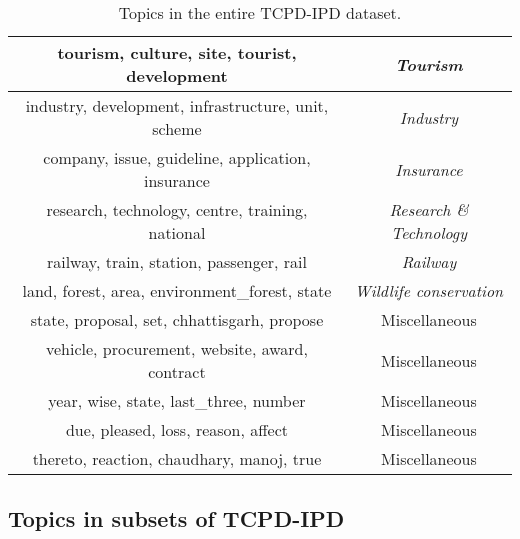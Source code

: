 \documentclass[10pt, a4paper]{article}
\begin{document}
\begin{table}[!htbp]
\begin{adjustbox}{width=0.99\linewidth}
\begin{tabular}{|c|c|}
        tourism, culture, site, tourist, development & \textit{Tourism} \\ \hline
        industry, development, infrastructure, unit, scheme & \textit{Industry} \\ \hline
        company, issue, guideline, application, insurance & \textit{Insurance} \\ \hline
        research, technology, centre, training, national & \textit{Research \& Technology} \\ \hline
        railway, train, station, passenger, rail & \textit{Railway} \\ \hline
        land, forest, area, environment\_forest, state & \textit{Wildlife conservation} \\ \hline
        state, proposal, set, chhattisgarh, propose & Miscellaneous \\ \hline
                vehicle, procurement, website, award, contract & Miscellaneous \\ \hline
        year, wise, state, last\_three, number & Miscellaneous \\ \hline
        due, pleased, loss, reason, affect & Miscellaneous \\ \hline
        thereto, reaction, chaudhary, manoj, true & Miscellaneous \\ \hline
    \end{tabular}
\end{adjustbox}
\captionsetup{justification=centering}
\caption{
Topics in the entire TCPD-IPD dataset.
\label{Tab:Global_topics}}
\end{table}

\subsection{Topics in subsets of TCPD-IPD}
\label{ap:quality}
\end{document}
